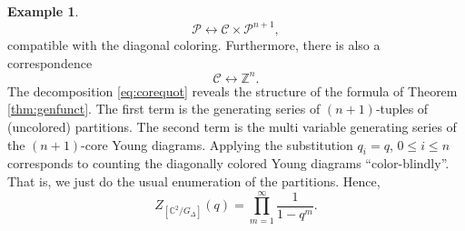 \documentclass[11pt,a4paper]{amsart}
\newtheorem{corollary}[theorem]{Corollary}
\theoremstyle{definition}
\newtheorem{example}[theorem]{Example}
\newcommand{\SZ}{\mathbb{Z}}                    %
\newcommand{\SC}{\mathbb{C}}                    %
\begin{document}
\begin{example}
\begin{equation}\label{eq:corequot} {\mathcal P} \longleftrightarrow {\mathcal C} \times {\mathcal P}^{n+1}, \end{equation}
 compatible with the diagonal coloring. Furthermore, there is also a correspondence
 \begin{equation*}\label{typeA-cores} 
{\mathcal C} \longleftrightarrow \SZ^{n}. \end{equation*}
The decomposition \eqref{eq:corequot} reveals the structure of the
formula of Theorem \ref{thm:genfunct}. The first term is the generating series of $(n+1)$-tuples of 
(uncolored) partitions. The second term is the multi variable generating series of the $(n+1)$-core Young diagrams. Applying the substitution $q_i=q$, $0 \leq i \leq n$ corresponds to counting the diagonally colored Young diagrams ``color-blindly''. That is, we just do the usual enumeration of the partitions. Hence,
\[ Z_{[\SC^2/G_\Delta]}(q)=\prod_{m=1}^{\infty}\frac{1}{1-q^m}.\]
\end{example}


\end{document}

